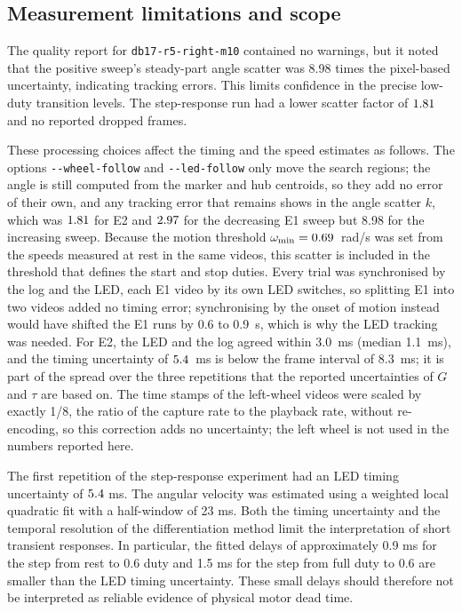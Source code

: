 \subsection{Measurement limitations and scope}
The quality report for \texttt{db17-r5-right-m10} contained no warnings,
but it noted that the positive sweep's steady-part angle scatter was
8.98 times the pixel-based uncertainty, indicating tracking errors.
This limits confidence in the precise low-duty transition levels.
The step-response run had a lower scatter factor of $1.81$ and no
reported dropped frames.

These processing choices affect the timing and the speed estimates as follows. The options \texttt{-{}-wheel-follow} and \texttt{-{}-led-follow} only move the search regions; the angle is still computed from the marker and hub centroids, so they add no error of their own, and any tracking error that remains shows in the angle scatter $k$, which was $1.81$ for E2 and $2.97$ for the decreasing E1 sweep but 8.98 for the increasing sweep. Because the motion threshold $\omega_{\min} = 0.69$~rad/s was set from the speeds measured at rest in the same videos, this scatter is included in the threshold that defines the start and stop duties. Every trial was synchronised by the log and the LED, each E1 video by its own LED switches, so splitting E1 into two videos added no timing error; synchronising by the onset of motion instead would have shifted the E1 runs by 0.6 to 0.9~s, which is why the LED tracking was needed. For E2, the LED and the log agreed within 3.0~ms (median 1.1~ms), and the timing uncertainty of $5.4$~ms is below the frame interval of 8.3~ms; it is part of the spread over the three repetitions that the reported uncertainties of $G$ and $\tau$ are based on. The time stamps of the left-wheel videos were scaled by exactly 1/8, the ratio of the capture rate to the playback rate, without re-encoding, so this correction adds no uncertainty; the left wheel is not used in the numbers reported here.

The first repetition of the step-response experiment had an LED timing
uncertainty of $5.4$ ms. The angular velocity was estimated using
a weighted local quadratic fit with a half-window of 23 ms.
Both the timing uncertainty and the temporal resolution of the
differentiation method limit the interpretation of short transient
responses. In particular, the fitted delays of approximately 0.9 ms
for the step from rest to 0.6 duty and 1.5 ms for the step from full
duty to 0.6 are smaller than the LED timing uncertainty.
These small delays should therefore not be interpreted as reliable
evidence of physical motor dead time.

